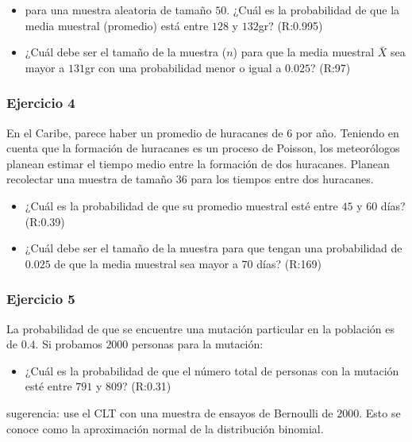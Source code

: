 \documentclass[
]{book}
\providecommand{\tightlist}{%
  \setlength{\itemsep}{0pt}\setlength{\parskip}{0pt}}
\begin{document}
\begin{itemize}
\item
  para una muestra aleatoria de tamaño \(50\). ¿Cuál es la probabilidad de que
  la media muestral (promedio) está entre \(128\) y \(132\)gr? (R:0.995)
\item
  ¿Cuál debe ser el tamaño de la muestra (\(n\)) para que la media muestral \(\bar{X}\) sea mayor a \(131\)gr con una probabilidad menor o igual a \(0.025\)? (R:97)
\end{itemize}

\hypertarget{ejercicio-4-3}{%
\subsubsection{Ejercicio 4}\label{ejercicio-4-3}}

En el Caribe, parece haber un promedio de huracanes de \(6\) por año. Teniendo en cuenta que la formación de huracanes es un proceso de Poisson, los meteorólogos planean estimar el tiempo medio entre la formación de dos huracanes. Planean recolectar una muestra de tamaño \(36\) para los tiempos entre dos huracanes.

\begin{itemize}
\item
  ¿Cuál es la probabilidad de que su promedio muestral esté entre \(45\) y \(60\) días? (R:0.39)
\item
  ¿Cuál debe ser el tamaño de la muestra para que tengan una probabilidad de \(0.025\) de que la media muestral sea mayor a \(70\) días? (R:169)
\end{itemize}

\hypertarget{ejercicio-5-2}{%
\subsubsection{Ejercicio 5}\label{ejercicio-5-2}}

La probabilidad de que se encuentre una mutación particular en la población es de \(0.4\). Si probamos \(2000\) personas para la mutación:

\begin{itemize}
\tightlist
\item
  ¿Cuál es la probabilidad de que el número total de personas con la mutación esté entre \(791\) y \(809\)? (R:0.31)
\end{itemize}

sugerencia: use el CLT con una muestra de ensayos de Bernoulli de \(2000\). Esto se conoce como la aproximación normal de la distribución binomial.
\end{document}

